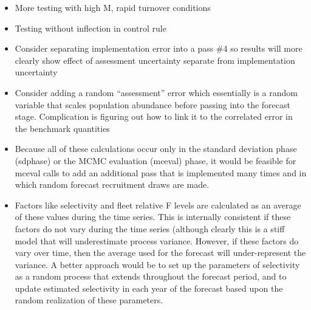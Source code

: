 \begin{itemize}
	\item More testing with high M, rapid turnover conditions
	\item Testing without inflection in control rule
	\item Consider separating implementation error into a pass \#4 so results will more clearly show effect of assessment uncertainty separate from implementation uncertainty
	\item Consider adding a random ``assessment'' error which essentially is a random variable that scales population abundance before passing into the forecast stage. Complication is figuring out how to link it to the correlated error in the benchmark quantities
	\item Because all of these calculations occur only in the standard deviation phase (sdphase) or the MCMC evaluation (mceval) phase, it would be feasible for mceval calls to add an additional pass that is implemented many times and in which random forecast recruitment draws are made.
	\item Factors like selectivity and fleet relative F levels are calculated as an average of these values during the time series. This is internally consistent if these factors do not vary during the time series (although clearly this is a stiff model that will underestimate process variance. However, if these factors do vary over time, then the average used for the forecast will under-represent the variance. A better approach would be to set up the parameters of selectivity as a random process that extends throughout the forecast period, and to update estimated selectivity in each year of the forecast based upon the random realization of these parameters.
\end{itemize}

	
